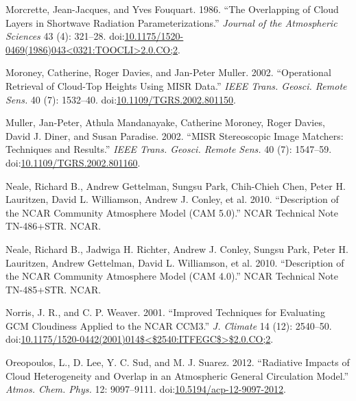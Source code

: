 \hypertarget{ref-morcretteux5fandux5ffouquartux5f1986}{}
Morcrette, Jean-Jacques, and Yves Fouquart. 1986. ``The Overlapping of
Cloud Layers in Shortwave Radiation Parameterizations.'' \emph{Journal
of the Atmospheric Sciences} 43 (4): 321--28.
doi:\href{https://doi.org/10.1175/1520-0469(1986)043\%3C0321:TOOCLI\%3E2.0.CO;2}{10.1175/1520-0469(1986)043\textless{}0321:TOOCLI\textgreater{}2.0.CO;2}.

\hypertarget{ref-moroneyux5fetux5falux5f2002}{}
Moroney, Catherine, Roger Davies, and Jan-Peter Muller. 2002.
``Operational Retrieval of Cloud-Top Heights Using MISR Data.''
\emph{IEEE Trans. Geosci. Remote Sens.} 40 (7): 1532--40.
doi:\href{https://doi.org/10.1109/TGRS.2002.801150}{10.1109/TGRS.2002.801150}.

\hypertarget{ref-mullerux5fetux5falux5f2002}{}
Muller, Jan-Peter, Athula Mandanayake, Catherine Moroney, Roger Davies,
David J. Diner, and Susan Paradise. 2002. ``MISR Stereoscopic Image
Matchers: Techniques and Results.'' \emph{IEEE Trans. Geosci. Remote
Sens.} 40 (7): 1547--59.
doi:\href{https://doi.org/10.1109/TGRS.2002.801160}{10.1109/TGRS.2002.801160}.

\hypertarget{ref-nealeux5fetux5falux5f2010b}{}
Neale, Richard B., Andrew Gettelman, Sungsu Park, Chih-Chieh Chen, Peter
H. Lauritzen, David L. Williamson, Andrew J. Conley, et al. 2010.
``Description of the NCAR Community Atmosphere Model (CAM 5.0).'' NCAR
Technical Note TN-486+STR. NCAR.

\hypertarget{ref-nealeux5fetux5falux5f2010a}{}
Neale, Richard B., Jadwiga H. Richter, Andrew J. Conley, Sungsu Park,
Peter H. Lauritzen, Andrew Gettelman, David L. Williamson, et al. 2010.
``Description of the NCAR Community Atmosphere Model (CAM 4.0).'' NCAR
Technical Note TN-485+STR. NCAR.

\hypertarget{ref-norrisux5fandux5fweaverux5f2001}{}
Norris, J. R., and C. P. Weaver. 2001. ``Improved Techniques for
Evaluating GCM Cloudiness Applied to the NCAR CCM3.'' \emph{J. Climate}
14 (12): 2540--50.
doi:\href{https://doi.org/10.1175/1520-0442(2001)014$\%3C$2540:ITFEGC$\%3E$2.0.CO;2}{10.1175/1520-0442(2001)014\$\textless{}\$2540:ITFEGC\$\textgreater{}\$2.0.CO;2}.

\hypertarget{ref-oreopoulosux5fetux5falux5f2012}{}
Oreopoulos, L., D. Lee, Y. C. Sud, and M. J. Suarez. 2012. ``Radiative
Impacts of Cloud Heterogeneity and Overlap in an Atmospheric General
Circulation Model.'' \emph{Atmos. Chem. Phys.} 12: 9097--9111.
doi:\href{https://doi.org/10.5194/acp-12-9097-2012}{10.5194/acp-12-9097-2012}.

